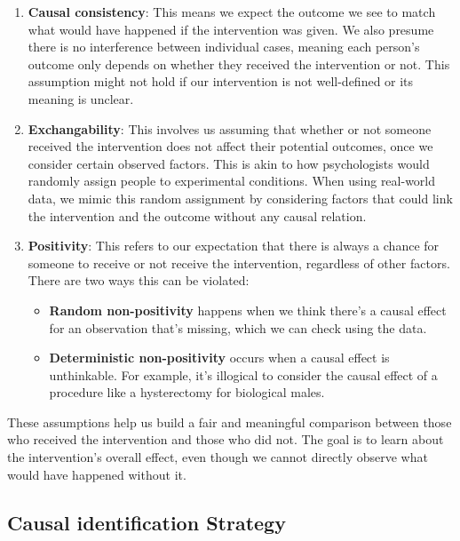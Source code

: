 \documentclass[
  singlecolumn]{report}
\begin{document}
\begin{enumerate}
\def\labelenumi{\arabic{enumi}.}
\item
  \textbf{Causal consistency}: This means we expect the outcome we see
  to match what would have happened if the intervention was given. We
  also presume there is no interference between individual cases,
  meaning each person's outcome only depends on whether they received
  the intervention or not. This assumption might not hold if our
  intervention is not well-defined or its meaning is unclear.
\item
  \textbf{Exchangability}: This involves us assuming that whether or not
  someone received the intervention does not affect their potential
  outcomes, once we consider certain observed factors. This is akin to
  how psychologists would randomly assign people to experimental
  conditions. When using real-world data, we mimic this random
  assignment by considering factors that could link the intervention and
  the outcome without any causal relation.
\item
  \textbf{Positivity}: This refers to our expectation that there is
  always a chance for someone to receive or not receive the
  intervention, regardless of other factors. There are two ways this can
  be violated:

  \begin{itemize}
  \item
    \textbf{Random non-positivity} happens when we think there's a
    causal effect for an observation that's missing, which we can check
    using the data.
  \item
    \textbf{Deterministic non-positivity} occurs when a causal effect is
    unthinkable. For example, it's illogical to consider the causal
    effect of a procedure like a hysterectomy for biological males.
  \end{itemize}
\end{enumerate}

These assumptions help us build a fair and meaningful comparison between
those who received the intervention and those who did not. The goal is
to learn about the intervention's overall effect, even though we cannot
directly observe what would have happened without it.

\hypertarget{causal-identification-strategy}{%
\subsection{Causal identification
Strategy}\label{causal-identification-strategy}}
\end{document}
